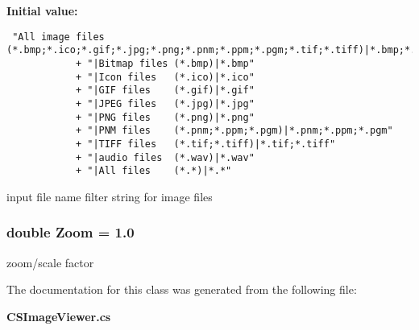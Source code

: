 {\bf Initial value:}

\footnotesize\begin{verbatim} "All image files (*.bmp;*.ico;*.gif;*.jpg;*.png;*.pnm;*.ppm;*.pgm;*.tif;*.tiff)|*.bmp;*.ico;*.gif;*.jpg;*.png;*.pnm;*.ppm;*.pgm;*.tif;*.tiff"
            + "|Bitmap files (*.bmp)|*.bmp"
            + "|Icon files   (*.ico)|*.ico"
            + "|GIF files    (*.gif)|*.gif"
            + "|JPEG files   (*.jpg)|*.jpg"
            + "|PNG files    (*.png)|*.png"
            + "|PNM files    (*.pnm;*.ppm;*.pgm)|*.pnm;*.ppm;*.pgm"
            + "|TIFF files   (*.tif;*.tiff)|*.tif;*.tiff"
            + "|audio files  (*.wav)|*.wav"
            + "|All files    (*.*)|*.*"
\end{verbatim}\normalsize 
input file name filter string for image files 

\subsubsection{\setlength{\rightskip}{0pt plus 5cm}double {\bf Zoom} = 1.0\hspace{0.3cm}{\tt  [private]}}\label{class_c_s_image_viewer_1_1_c_s_image_viewer_0e089a5fee7fd471a09d154132e70d19}


zoom/scale factor 



The documentation for this class was generated from the following file:\begin{CompactItemize}
\item 
{\bf CSImage\-Viewer.cs}\end{CompactItemize}
